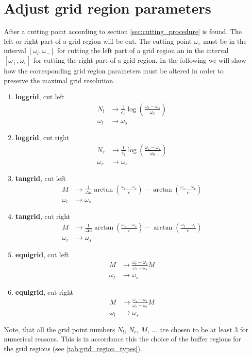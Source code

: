 \section{Adjust grid region parameters}\label{sec:app_cutting_gr}
After a cutting point according to section \ref{sec:cutting_procedure} is found. The left or right part of a grid region will be cut. The cutting point $\omega_s$ must be in the interval $[\omega_l, \omega_-]$ for cutting the left part of a grid region an in the interval $[\omega_+, \omega_r]$ for cutting the right part of a grid region. In the following we will show how the corresponding grid region parameters must be altered in order to preserve the maximal grid resolution. 
\begin{enumerate}
	\item {\bf loggrid}, cut left
	\begin{align*}
		N_l&\to\frac{1}{c_1} \log\left(\frac{\omega_k -\omega_s}{\omega_0}\right) \\
		\omega_l&\to\omega_s
	\end{align*}
	\item {\bf loggrid}, cut right
	\begin{align*}
		N_r&\to\frac{1}{c_2} \log\left(\frac{\omega_s -\omega_k}{\omega_0}\right) \\
		\omega_r&\to\omega_s
	\end{align*}
	\item {\bf tangrid}, cut left
	\begin{align*}
                 M&\to\frac{1}{\Delta u} \arctan \left( \frac{\omega_r-\omega_c}{c} \right)-\arctan \left( \frac{\omega_s-\omega_c}{c} \right)\\
		\omega_l&\to\omega_s
	\end{align*}
	\item {\bf tangrid}, cut right
	\begin{align*}
                 M&\to\frac{1}{\Delta u} \arctan \left( \frac{\omega_s-\omega_c}{c} \right)-\arctan \left( \frac{\omega_l-\omega_c}{c} \right)\\
		\omega_r&\to\omega_s
	\end{align*}
	\item {\bf equigrid}, cut left
	\begin{align*}
                 M&\to\frac{\omega_r-\omega_s}{\omega_r-\omega_l} M\\
		\omega_l&\to\omega_s
	\end{align*}
	\item {\bf equigrid}, cut right
	\begin{align*}
                 M&\to\frac{\omega_s-\omega_l}{\omega_r-\omega_l} M\\
		\omega_l&\to\omega_s
	\end{align*}
\end{enumerate}
Note, that all the grid point numbers $N_l$, $N_r$, $M$, $\dots$ are chosen to be at least $3$ for numerical reasons. This is in accordance this the choice of the buffer regions for the grid regions (see \ref{tab:grid_region_types}).









